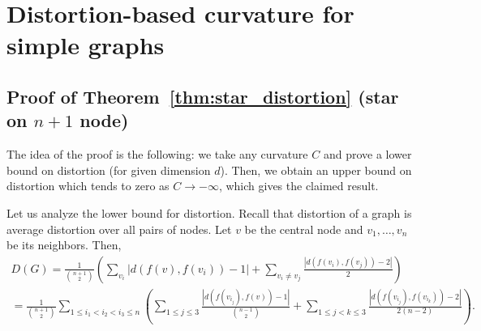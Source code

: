 \documentclass{article} %
\begin{document}






\appendix

\section{Distortion-based curvature for simple graphs}

\subsection{Proof of Theorem~\ref{thm:star_distortion} (star on $n+1$ node)}

The idea of the proof is the following: we take any curvature $C$ and prove a lower bound on distortion (for given dimension $d$). Then, we obtain an upper bound on distortion which tends to zero as $C \to -\infty$, which gives the claimed result.

Let us analyze the lower bound for distortion. Recall that distortion of a graph is average distortion over all pairs of nodes. Let $v$ be the central node and $v_1, \ldots, v_n$ be its neighbors. Then,
\begin{multline*}
D(G) = \frac{1}{\binom{n+1}{2}} \left( \sum_{v_i} {|d(f(v),f(v_i)) - 1|} + \sum_{v_i \neq v_j} \frac{|d(f(v_i),f(v_j)) - 2|}{2} \right) \\
= \frac{1}{\binom{n+1}{2}} \sum_{1 \le i_1 < i_2 < i_3 \le n} \left(
\sum_{1\le j \le 3}  \frac{|d(f(v_{i_j}),f(v)) - 1|}{{n-1 \choose 2}} +
\sum_{1\le j < k\le 3}  \frac{|d(f(v_{i_j}),f(v_{i_k})) - 2|}{2(n-2)}   \right).
\end{multline*}
\end{document}
